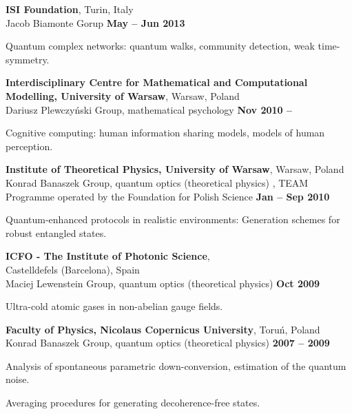 \documentclass[margin,line]{resume}
\begin{document}
\begin{resume}
    {\bf  ISI Foundation}, Turin, Italy\\
    Jacob Biamonte Gorup \hfill {\bf May -- Jun 2013}\\
    \begin{list2}
        \vspace*{-4mm}
        \item Quantum complex networks: quantum walks, community detection, weak time-symmetry.
    \end{list2}

	{\bf  Interdisciplinary Centre for Mathematical and Computational Modelling, University of Warsaw}, Warsaw, Poland\\
	Dariusz Plewczyński Group, mathematical psychology \hfill {\bf Nov 2010 -- }\\
    \begin{list2}
        \vspace*{-4mm}
        \item Cognitive computing: human information sharing models, models of human perception.
    \end{list2}

	{\bf Institute of Theoretical Physics, University of Warsaw}, Warsaw, Poland\\
	Konrad Banaszek Group, quantum optics (theoretical physics) ,
	TEAM Programme operated by the Foundation for Polish Science \hfill {\bf Jan -- Sep 2010}\\
    \begin{list2}
        \vspace*{-4mm}
        \item Quantum-enhanced protocols in realistic environments: Generation schemes for robust entangled states.
    \end{list2}

    {\bf ICFO - The Institute of Photonic Science},\\ Castelldefels (Barcelona), Spain\\
    Maciej Lewenstein Group, quantum optics (theoretical physics) \hfill {\bf Oct 2009}\\
    \begin{list2}
        \vspace*{-4mm}
        \item Ultra-cold atomic gases in non-abelian gauge fields.
    \end{list2}

    {\bf Faculty of Physics, Nicolaus Copernicus University}, Toruń, Poland\\
    Konrad Banaszek Group, quantum optics (theoretical physics) \hfill {\bf 2007 -- 2009}\\
    \begin{list2}
        \vspace*{-4mm}
        \item Analysis of spontaneous parametric down-conversion, estimation of the quantum noise.
        \item Averaging procedures for generating decoherence-free states.
    \end{list2}


\end{resume}
\end{document}
